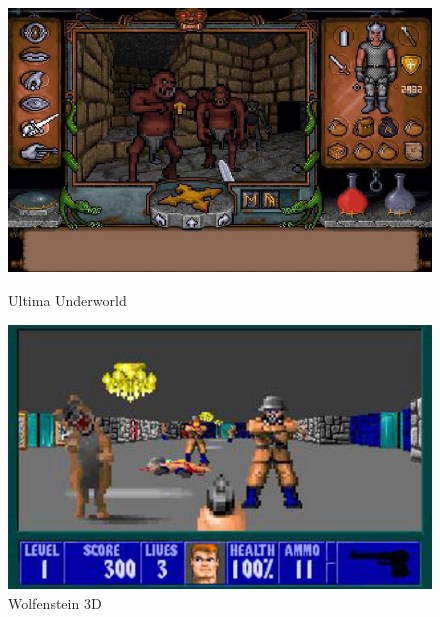\documentclass[11pt]{article}
\begin{document}
\begin{figure}
	\begin{minipage}{0.48\textwidth}
		\includegraphics[width=\linewidth]{image/Ultima_Underworld.jpg}
		\hspace*{-0.5cm}
		\caption{Ultima Underworld}
		\label{fig:ultimaunderworld}
	\end{minipage}
	\begin{minipage}{0.48\textwidth}
		\includegraphics[width=\linewidth]{image/wolfenstein_3d.jpg}
		\hspace*{-0.5cm}
		\caption{Wolfenstein 3D}
		\label{fig:wolfenstein3d}
	\end{minipage}
\end{figure}
\end{document}
